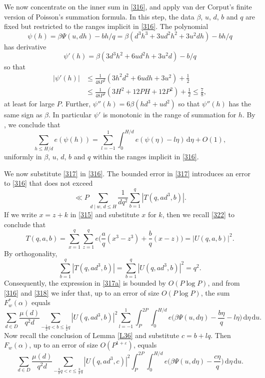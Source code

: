 \documentclass[reqno]{amsart}
\newcommand\dd{{\mathrm d}}
\numberwithin{equation}{section}
\begin{document}
We now concentrate on the inner sum in \eqref{316}, and apply van der Corput's finite version of Poisson's summation formula. In this step, the data $\beta$, $u$, $d$, $b$ and $q$ are fixed but restricted to the ranges implicit in \eqref{316}. The polynomial
$$ \psi(h) = \beta\Psi(u,dh) - bh/q = \beta(d^3h^3 + 3ud^2h^2 + 3u^2dh) -bh/q $$
has derivative
$$ \psi'(h) =\beta(3d^3h^2+6ud^2h+3u^2d) -b/q $$
so that
\begin{align*} |\psi'(h)| &\le \frac{1}{48P^2} (3h^2d^2 +6udh+3u^2) +\frac12 \\ & \le \frac{1}{48P^2}
(3H^2+12PH + 12 P^2) +\frac12 \le \frac78, \end{align*}
at least for large $P$. Further, $\psi''(h) = 6\beta(hd^3+ud^2)$ so that $\psi''(h)$ has the same sign as $\beta$. In particular $\psi'$ is monotonic in the range of summation for $h$. By \cite[Lemma 4.2]{hlm}, we conclude that
\begin{equation}\label{317}
\sum_{h\le H/d} e(\psi(h)) = \sum_{l=-1}^1 \int_0^{H/d} e(\psi(\eta)- l\eta)\,\dd \eta+ O(1), \end{equation} 
uniformly in $\beta$, $u$, $d$, $b$ and $q$ within the ranges implicit in \eqref{316}.

We now substitute \eqref{317} in \eqref{316}. The bounded error in \eqref{317} introduces an error to \eqref{316} that does not exceed
\begin{equation}\label{317a} \ll P \sum_{d\mid w,\,d\le H} \frac{1}{dq^2} \sum_{b=1}^q |T(q,ad^3,b)|. \end{equation}
If we write $x=z+k$ in \eqref{315} and substitute $x$ for $k$, then we recall
\eqref{322} to conclude that
\begin{equation}\label{318} T(q,a,b) = \sum_{x=1}^q \sum_{z=1}^q e\Big(\frac{a}{q}(x^3-z^3) + \frac{b}{q}(x-z)\Big) = |U(q,a,b)|^2.\end{equation}
By orthogonality,
$$ \sum_{b=1}^q |T(q,ad^3,b)| = \sum_{b=1}^q |U(q,ad^3,b)|^2 = q^2. $$
Consequently, the expression in \eqref{317a} is bounded by $O(P\log P)$, and from \eqref{316} and \eqref{318} we infer that, up to an error of size $O(P\log P)$, the sum $F^*_w(\alpha)$ equals
$$
\sum_{d\in D} \frac{\mu(d)}{q^2d} \!\sum_{-\frac12 q<b\le\frac12 q} \!|U(q,ad^3, b)|^2 \sum_{l=-1}^1 \int_P^{2P}\!\!\!\int_0^{H/d}
\! e\Big(\beta\Psi(u,d\eta)- \frac{b\eta}{q} - l\eta\Big)\,\dd \eta\,\dd u. $$
Now recall the conclusion of Lemma \ref{L36} and substitute $c=b+lq$. Then $F_w(\alpha)$, up to an error of size $O(P^{1+\varepsilon})$, equals  
\begin{equation}\label{320} \sum_{d\in D} \frac{\mu(d)}{q^2d}
\!\sum_{-\frac32q<c\le \frac32 q}\!|U(q,ad^3, c)|^2 \int_P^{2P}\!\!\!\int_0^{H/d}
e\Big(\beta\Psi(u,d\eta)- \frac{c\eta}{q}\Big)\,\dd \eta\,\dd u .\end{equation} 
\end{document}
